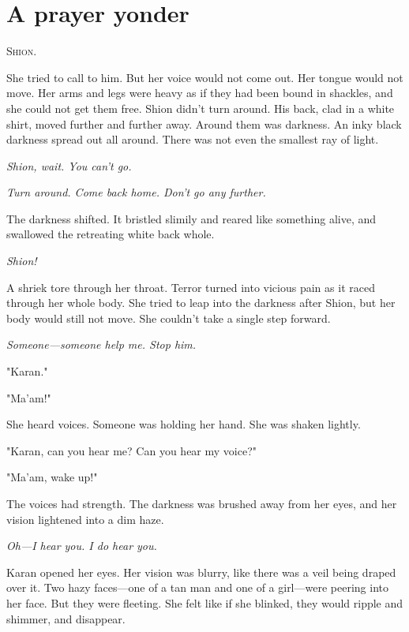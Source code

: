 
\chapter{A prayer yonder}


\lettrine{S}{hion}.

She tried to call to him. But her voice would not come out. Her tongue
would not move. Her arms and legs were heavy as if they had been bound
in shackles, and she could not get them free. Shion didn't turn around.
His back, clad in a white shirt, moved further and further away. Around
them was darkness. An inky black darkness spread out all around. There
was not even the smallest ray of light.

\emph{Shion, wait. You can't go.}

\emph{Turn around. Come back home. Don't go any further.}

The darkness shifted. It bristled slimily and reared like something
alive, and swallowed the retreating white back whole.

\emph{Shion!}

A shriek tore through her throat. Terror turned into vicious pain as it
raced through her whole body. She tried to leap into the darkness after
Shion, but her body would still not move. She couldn't take a single
step forward.

\emph{Someone---someone help me. Stop him.}

"Karan."

"Ma'am!"

She heard voices. Someone was holding her hand. She was shaken lightly.

"Karan, can you hear me? Can you hear my voice?"

"Ma'am, wake up!"

The voices had strength. The darkness was brushed away from her eyes,
and her vision lightened into a dim haze.

\emph{Oh---I hear you. I do hear you.}

Karan opened her eyes. Her vision was blurry, like there was a veil
being draped over it. Two hazy faces---one of a tan man and one of a
girl---were peering into her face. But they were fleeting. She felt like
if she blinked, they would ripple and shimmer, and disappear.

